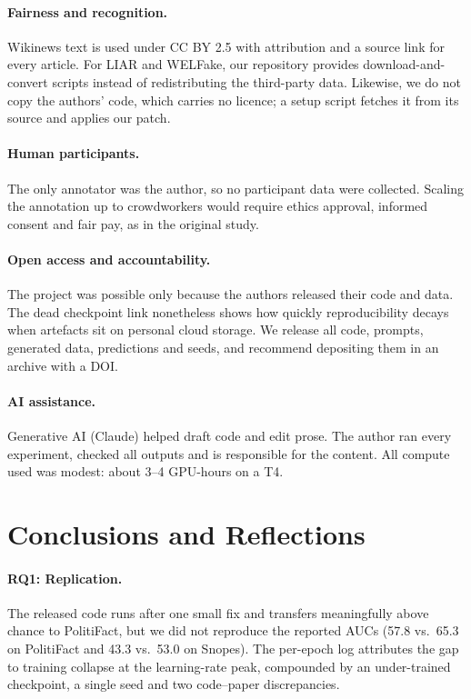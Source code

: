\documentclass[11pt]{article}
\begin{document}
\paragraph{Fairness and recognition.} Wikinews text is used under CC BY 2.5 with attribution and a source link for every article. For LIAR and WELFake, our repository provides download-and-convert scripts instead of redistributing the third-party data. Likewise, we do not copy the authors' code, which carries no licence; a setup script fetches it from its source and applies our patch.

\paragraph{Human participants.} The only annotator was the author, so no participant data were collected. Scaling the annotation up to crowdworkers would require ethics approval, informed consent and fair pay, as in the original study.

\paragraph{Open access and accountability.} The project was possible only because the authors released their code and data. The dead checkpoint link nonetheless shows how quickly reproducibility decays when artefacts sit on personal cloud storage. We release all code, prompts, generated data, predictions and seeds, and recommend depositing them in an archive with a DOI.

\paragraph{AI assistance.} Generative AI (Claude) helped draft code and edit prose. The author ran every experiment, checked all outputs and is responsible for the content. All compute used was modest: about 3--4 GPU-hours on a T4.

\section{Conclusions and Reflections}
\label{sec:conclusion}

\paragraph{RQ1: Replication.} The released code runs after one small fix and transfers meaningfully above chance to PolitiFact, but we did not reproduce the reported AUCs (57.8 vs.\ 65.3 on PolitiFact and 43.3 vs.\ 53.0 on Snopes). The per-epoch log attributes the gap to training collapse at the learning-rate peak, compounded by an under-trained checkpoint, a single seed and two code--paper discrepancies.
\end{document}
